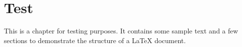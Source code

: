 \chapter{Test}
This is a chapter for testing purposes. It contains some sample text and a few sections to demonstrate the structure of a LaTeX document.